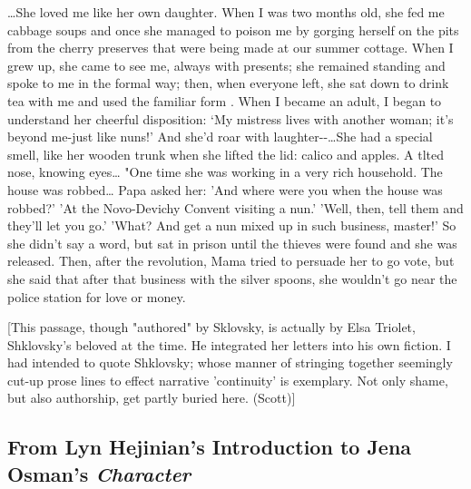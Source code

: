 \documentclass[
]{memoir}
\begin{document}
\ldots{}She loved me like her own daughter. When I was two months old,
she fed me cabbage soups and once she managed to poison me by gorging
herself on the pits from the cherry preserves that were being made at
our summer cottage. When I grew up, she came to see me, always with
presents; she remained standing and spoke to me in the formal way; then,
when everyone left, she sat down to drink tea with me and used the
familiar form . When I became an adult, I began to understand her
cheerful disposition: `My mistress lives with another woman; it's beyond
me-just like nuns!' And she'd roar with laughter-\/-\ldots{}She had a
special smell, like her wooden trunk when she lifted the lid: calico and
apples. A tlted nose, knowing eyes\ldots{} "One time she was working in
a very rich household. The house was robbed\ldots{} Papa asked her: 'And
where were you when the house was robbed?' 'At the Novo-Devichy Convent
visiting a nun.' 'Well, then, tell them and they'll let you go.' 'What?
And get a nun mixed up in such business, master!' So she didn't say a
word, but sat in prison until the thieves were found and she was
released. Then, after the revolution, Mama tried to persuade her to go
vote, but she said that after that business with the silver spoons, she
wouldn't go near the police station for love or money.

{[}This passage, though "authored" by Sklovsky, is actually by Elsa
Triolet, Shklovsky's beloved at the time. He integrated her letters into
his own fiction. I had intended to quote Shklovsky; whose manner of
stringing together seemingly cut-up prose lines to effect narrative
'continuity' is exemplary. Not only shame, but also authorship, get
partly buried here. (Scott){]}

\hypertarget{from-lyn-hejinians-introduction-to-jena-osmans-character}{%
\subsection*{\texorpdfstring{From Lyn Hejinian's Introduction to Jena
Osman's
\emph{Character}}{From Lyn Hejinian's Introduction to Jena Osman's Character}}\label{from-lyn-hejinians-introduction-to-jena-osmans-character}}
\end{document}
